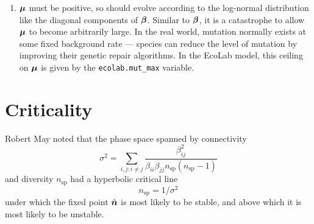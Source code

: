 \documentclass{article}
\newcommand{\bbeta}{\mbox{\boldmath{$\beta$}}}   %
\newcommand{\bmu}{\mbox{\boldmath{$\mu$}}}       %
\newcommand{\bn}{\mbox{\boldmath{$n$}}}          %
\providecommand{\naturals}{\mathbb{N}}
\begin{document}
\begin{enumerate}
To convert  condition (\ref{boundedness2}) into something tractable for the mutation
operator, we make use of the fact that $n\in\naturals^n$.

Let 
\begin{displaymath}
b=\sum_{i: B_i+C_i>0}B_i+C_i.
\end{displaymath}
Then a sufficient but
not necessary condition for condition (\ref{boundedness2}) is
\begin{displaymath}
b+Dn_2\leq0
\end{displaymath}

Since $D<0$, the maximum of $b+Dn_2$ for
$n_2\in\naturals$ occurs for $n_2=1$, so the condition becomes:
\begin{equation}\label{final-condition}
  D<-b.
\end{equation}

Originally, this condition was achieved by adjusting the values of the
offdiagonal components added to the interaction matrix \bbeta, but
this had the unfortunate effect of gradually reducing the connectivity
over simulation time, leading to a natural growth in diversity (see
\S\ref{nsp-connectivity}). So now, we adjust the newly added diagonal
term $D$ to be strictly less than $\max\{-b, 0\}$, retaining a natural
conservation of connectivity under mutation dynamics.

\item $\bmu$ must be positive, so should evolve according to the
  log-normal distribution like the diagonal components of $\bbeta$.
  Similar to $\bbeta$, it is a catastrophe to allow $\bmu$ to become
  arbitrarily large. In the real world, mutation normally exists at
  some fixed background rate --- species can reduce the level of
  mutation by improving their genetic repair algorithms. In the EcoLab
  model, this ceiling on $\bmu$ is given by the
  \verb|ecolab.mut_max| variable.

\end{enumerate}

\section{Criticality}

Robert May\cite{May72} noted that the phase space spanned by
connectivity
\begin{equation}
\sigma^2=\sum_{i,j: i\ne j}
\frac{\beta_{ij}^2}{\beta_{ii}\beta_{jj}n_\mathrm{sp}(n_\mathrm{sp}-1)}
\end{equation}
and diversity
$n_\mathrm{sp}$ had a hyperbolic critical line
\begin{equation}\label{May-criterion}
  n_\mathrm{sp}=1/\sigma^2
\end{equation}
under which the fixed point $\hat{\bn}$ is
most likely to be stable, and above which it is most likely to be
unstable.
\end{document}
